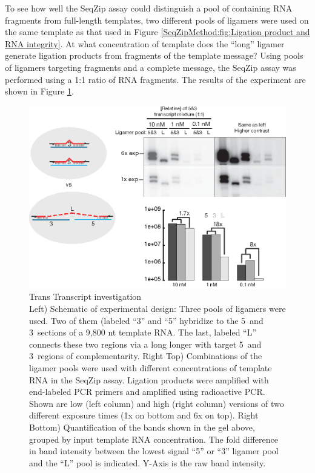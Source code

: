     To see how well the SeqZip assay could distinguish a pool of containing RNA fragments from full-length templates, two different pools of ligamers were used on the same template as that used in Figure \ref{SeqZipMethod:fig:Ligation product and RNA integrity}. At what concentration of template does the ``long'' ligamer generate ligation products from fragments of the template message? Using pools of ligamers targeting fragments and a complete message, the SeqZip assay was performed using a 1:1 ratio of RNA fragments. The results of the experiment are shown in Figure \ref{SeqZipMethod:fig: trans Tx for degradation}.

  	\begin{figure} %
    	\centering 
    	\includegraphics{Figures/SeqZipMethod/TransRNAWithSeqZip.eps}
    	\caption[Trans Transcript investigation]
    	{
	      Trans Transcript investigation\\[0.25cm]
  	    Left) Schematic of experimental design: Three pools of ligamers were used. Two of them (labeled ``3'' and ``5'' hybridize to the 5\textprime~and 3\textprime~sections of a 9,800 nt template RNA. The last, labeled ``L'' connects these two regions via a long longer with target 5\textprime~and 3\textprime~regions of complementarity. Right Top) Combinations of the ligamer pools were used with different concentrations of template RNA in the SeqZip assay. Ligation products were amplified with end-labeled PCR primers and amplified using radioactive PCR. Shown are low (left column) and high (right column) versions of two different exposure times (1x on bottom and 6x on top). Right Bottom) Quantification of the bands shown in the gel above, grouped by input template RNA concentration. The fold difference in band intensity between the lowest signal ``5'' or ``3'' ligamer pool and the ``L'' pool is indicated. Y-Axis is the raw band intensity.
		    }
   	 \label{SeqZipMethod:fig: trans Tx for degradation}
	 	 \end{figure}

